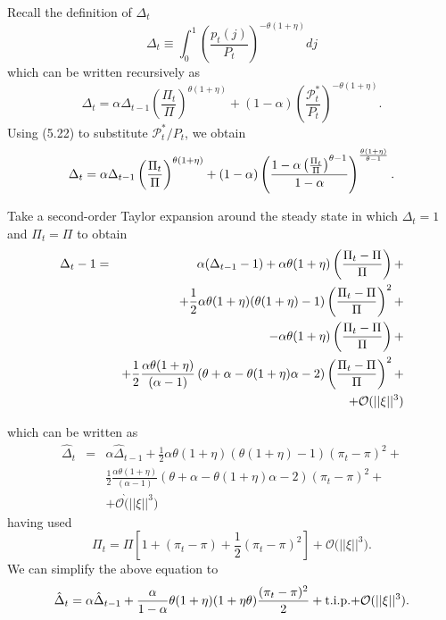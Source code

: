 \documentclass[11pt,aspectratio=169]{beamer}
\begin{document}
\begin{frame}\small
Recall the definition of $\Delta _{t}$%
\begin{equation*}
\Delta _{t}\equiv \int_{0}^{1}\left( \frac{p_{t}(j)}{P_{t}}\right) ^{-\theta
(1+\eta )}dj
\end{equation*}%
which can be written recursively as 
\begin{equation*}
\Delta _{t}=\alpha {\Delta }_{t-1}\left( \frac{\Pi _{t}}{\Pi }\right)
^{\theta (1+\eta )}+(1-\alpha )\left( \frac{\mathcal{P}_{t}^{\ast }}{P_{t}}%
\right) ^{-\theta (1+\eta )}.
\end{equation*}%
Using (5.22) to substitute $\mathcal{P}_{t}^{\ast }/P_{t}$, we obtain%
\begin{equation}
\Delta _{t}=\alpha {\Delta }_{t-1}\left( \frac{\Pi _{t}}{\Pi }\right)
^{\theta (1+\eta )}+(1-\alpha )\left( \frac{1-\alpha \left( \frac{\Pi _{t}}{%
\Pi }\right) ^{\theta -1}}{1-\alpha }\right) ^{\frac{\theta (1+\eta )}{%
\theta -1}}.  \label{Deltadef}
\end{equation}%
\end{frame}
\begin{frame}\small
Take a second-order Taylor expansion around the steady state in which $%
\Delta _{t}=1$ and $\Pi _{t}=\Pi $ to obtain%
\begin{eqnarray*}
\Delta _{t}-1 &=&\alpha ({\Delta }_{t-1}-1)+\alpha \theta (1+\eta )\left( 
\frac{\Pi _{t}-\Pi }{\Pi }\right) + \\
&&+\frac{1}{2}\alpha \theta (1+\eta )(\theta (1+\eta )-1)\left( \frac{\Pi
_{t}-\Pi }{\Pi }\right) ^{2}+ \\
&&-\alpha \theta (1+\eta )\left( \frac{\Pi _{t}-\Pi }{\Pi }\right) + \\
&&+\frac{1}{2}\frac{\alpha \theta (1+\eta )}{\left( \alpha -1\right) }\left(
\theta +\alpha -\theta (1+\eta )\alpha -2\right) \left( \frac{\Pi _{t}-\Pi }{%
\Pi }\right) ^{2}+ \\
&&+\mathcal{O(}||\xi ||^{3})
\end{eqnarray*}
\end{frame}
\begin{frame}\small
which can be written as%
\begin{eqnarray*}
\hat{\Delta}_{t} &=&\alpha \hat{\Delta}_{t-1}+\frac{1}{2}\alpha \theta
(1+\eta )(\theta (1+\eta )-1)(\pi _{t}-\pi )^{2}+ \\
&&\frac{1}{2}\frac{\alpha \theta (1+\eta )}{\left( \alpha -1\right) }\left(
\theta +\alpha -\theta (1+\eta )\alpha -2\right) (\pi _{t}-\pi )^{2}+ \\
&&+\mathcal{O\grave{(}}||\xi ||^{3})
\end{eqnarray*}%
having used%
\begin{equation*}
\Pi _{t}=\Pi \left[ 1+(\pi _{t}-\pi )+\frac{1}{2}(\pi _{t}-\pi )^{2}\right] +%
\mathcal{O(}||\xi ||^{3}).
\end{equation*}%
$\allowbreak $We can simplify the above equation to%
\begin{equation*}
\hat{\Delta}_{t}=\alpha \hat{\Delta}_{t-1}+\frac{\alpha }{1-\alpha }\theta
(1+\eta )(1+\eta \theta )\frac{(\pi _{t}-\pi )^{2}}{2}+\mathrm{t.i.p.+}{%
\mathcal{O}}(||\xi ||^{3}).
\end{equation*}%
\end{frame}
\end{document}
